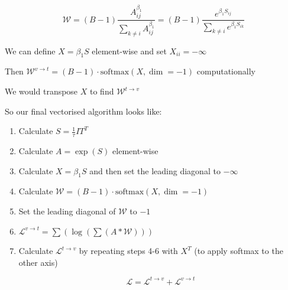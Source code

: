 \documentclass[a4paper,12pt]{article}
\begin{document}
$$
	\mathcal W = (B-1) \frac {A_{ij}^{\beta _1}}{\sum _{k \ne i} A_{ij} ^{\beta _1}} = (B-1) \frac {e^{\beta _1 S_{ij}}}{\sum _{k \ne i} e^{\beta _1 S_{ik}}}
$$


We can define $X=\beta _1 S$ element-wise and set $X_{ii}=-\infty$

Then $\mathcal W^{v \to t} = (B-1) \cdot \text{softmax}(X, \dim = -1)$ computationally

We would transpose $X$ to find $\mathcal W^{t \to v}$

So our final vectorised algorithm looks like:

\begin{enumerate}

	\item Calculate $S = \frac 1 \tau IT^T$
 	\item Calculate $A = \exp (S)$ element-wise
 	\item Calculate $X = \beta _1 S$ and then set the leading diagonal to $-\infty$
	\item Calculate $\mathcal W = (B-1) \cdot \text{softmax} (X, \dim = -1)$
 	\item Set the leading diagonal of $\mathcal W$ to $-1$
 	\item $\mathcal L^{v\to t} = \sum (\log (\sum (A * \mathcal W)))$
 	\item Calculate $\mathcal L ^{t\to v}$ by repeating steps 4-6 with $X^T$ (to apply softmax to the other axis)

\[
	\mathcal L = \mathcal L^{t \to v} + \mathcal L^{v \to t}
\]
\end{enumerate}
\end{document}
